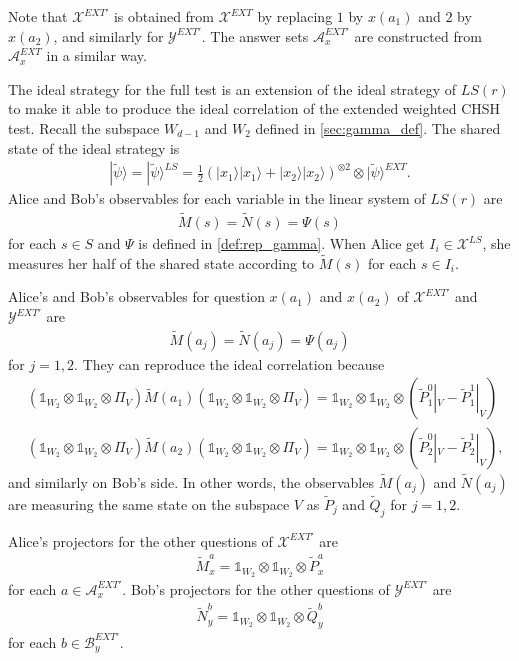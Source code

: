 \documentclass[11pt,letterpaper]{article}
\newcommand{\ket}[1]{|#1\rangle}
\newcommand{\x}{\otimes}
\newcommand{\calX}{\mathcal{X}}
\newcommand{\calY}{\mathcal{Y}}
\newcommand{\calA}{\mathcal{A}}
\newcommand{\calB}{\mathcal{B}}
\newcommand{\1}{\mathbb{1}}
\newcommand{\EXT}{EXT}
\newcommand{\LS}{LS}
\newcommand{\tP}{\tilde{P}}
\newcommand{\tQ}{\tilde{Q}}
\newcommand{\tM}{\tilde{M}}
\newcommand{\tN}{\tilde{N}}
\newcommand{\tpsi}{\tilde{\psi}}
\theoremstyle{definition}
\begin{document}
Note that $\calX^{\EXT'}$ is obtained from $\calX^{\EXT}$ by replacing 
$1$ by $x(a_1)$ and $2$ by $x(a_2)$, and similarly for $\calY^{\EXT'}$.
The answer sets $\calA_x^{\EXT'}$ are constructed from $\calA_x^{\EXT}$
in a similar way.

The ideal strategy for the full test is an extension of the ideal strategy of $\LS(r)$ to make it able to produce the ideal correlation of 
the extended weighted CHSH test.
Recall the subspace $W_{d-1}$ and $W_2$ defined in \cref{sec:gamma_def}.
The shared state of the ideal strategy is
\begin{align*}
    \ket{\tpsi} = \ket{\tpsi}^{\LS} = \frac{1}{2}(\ket{x_1}\ket{x_1} + 
    \ket{x_2}\ket{x_2})^{\x 2} \x \ket{\tpsi}^{\EXT}.
\end{align*}
Alice and Bob's observables for each variable in the linear system of 
$\LS(r)$ are 
\begin{align*}
    \tM(s) = \tN(s) = \Psi(s) 
\end{align*}
for each $s \in S$ and $\Psi$ is defined in \cref{def:rep_gamma}.
When Alice get $I_i \in \calX^{\LS}$, she measures her half of the shared
state according to $\tM(s)$ for each $s \in I_i$.

Alice's and Bob's observables for question $x(a_1)$ and $x(a_2)$ of $\calX^{\EXT'}$ and $\calY^{\EXT'}$ are
\begin{align*}
    \tM(a_j) = \tN(a_j) = \Psi(a_j) 
\end{align*}
for $j= 1,2$.
They can reproduce the ideal correlation because
\begin{align*}
    &(\1_{W_2} \x \1_{W_2} \x \Pi_V) \tM(a_1) (\1_{W_2} \x \1_{W_2} \x \Pi_V) = \1_{W_2} \x \1_{W_2} \x (\tP_1^0|_V - \tP_1^1|_V) \\
    &(\1_{W_2} \x \1_{W_2} \x \Pi_V) \tM(a_2) (\1_{W_2} \x \1_{W_2} \x \Pi_V) = \1_{W_2} \x \1_{W_2} \x (\tP_2^0|_V - \tP_2^1|_V),
\end{align*}
and similarly on Bob's side.
In other words, the observables $\tM(a_j)$ and $\tN(a_j)$ are 
measuring the same state on the subspace $V$ as $\tP_j$ and $\tQ_j$
for $j = 1,2$.

Alice's projectors for the other questions of $\calX^{\EXT'}$ are
\begin{align*}
    \tM_x^a = \1_{W_2} \x \1_{W_2} \x \tP_x^a
\end{align*}
for each $a \in \calA^{\EXT'}_x$.
Bob's projectors for the other questions of $\calY^{\EXT'}$ are 
\begin{align*}
    \tN_y^b = \1_{W_2} \x \1_{W_2} \x \tQ_y^b
\end{align*}
for each $b \in \calB^{\EXT'}_y$.
\end{document}
